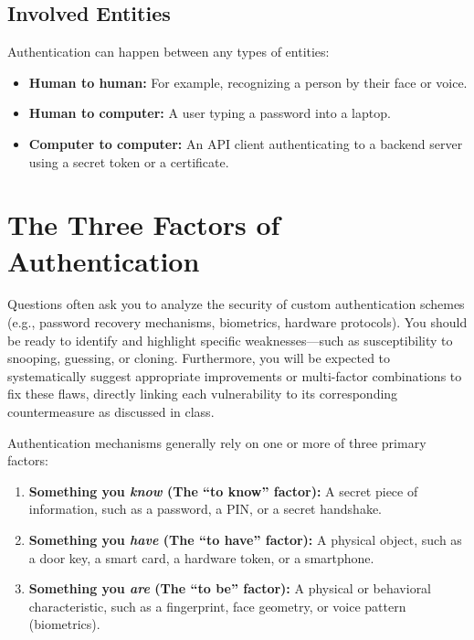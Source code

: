 \subsection{Involved Entities}
Authentication can happen between any types of entities:
\begin{itemize}
    \item \textbf{Human to human:} For example, recognizing a person by their face or voice.
    \item \textbf{Human to computer:} A user typing a password into a laptop.
    \item \textbf{Computer to computer:} An API client authenticating to a backend server using a secret token or a certificate.
\end{itemize}

\section{The Three Factors of Authentication}
\begin{tcolorbox}[colback=blue!5!white,colframe=blue!75!black,title=Exam Insight]
Questions often ask you to analyze the security of custom authentication schemes (e.g., password recovery mechanisms, biometrics, hardware protocols). You should be ready to identify and highlight specific weaknesses---such as susceptibility to snooping, guessing, or cloning. Furthermore, you will be expected to systematically suggest appropriate improvements or multi-factor combinations to fix these flaws, directly linking each vulnerability to its corresponding countermeasure as discussed in class.
\end{tcolorbox}

Authentication mechanisms generally rely on one or more of three primary factors:
\begin{enumerate}
    \item \textbf{Something you \textit{know} (The ``to know'' factor):} A secret piece of information, such as a password, a PIN, or a secret handshake.
    \item \textbf{Something you \textit{have} (The ``to have'' factor):} A physical object, such as a door key, a smart card, a hardware token, or a smartphone.
    \item \textbf{Something you \textit{are} (The ``to be'' factor):} A physical or behavioral characteristic, such as a fingerprint, face geometry, or voice pattern (biometrics).
\end{enumerate}

